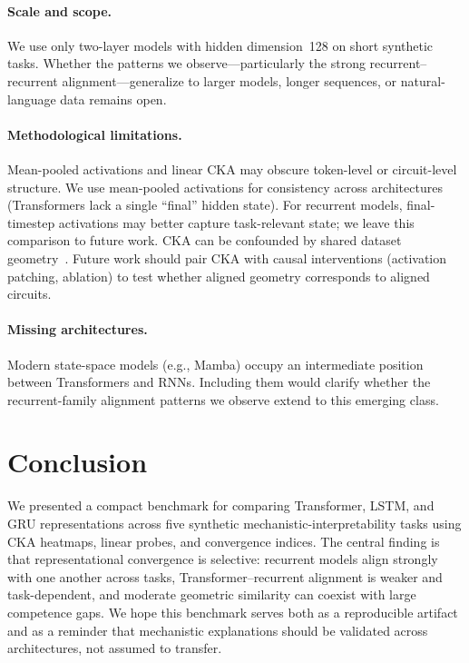 \documentclass{article}
\begin{document}
\paragraph{Scale and scope.}
We use only two-layer models with hidden dimension~128 on short 
synthetic tasks. Whether the patterns we observe---particularly 
the strong recurrent--recurrent alignment---generalize to larger 
models, longer sequences, or natural-language data remains open.

\paragraph{Methodological limitations.}
Mean-pooled activations and linear CKA may obscure token-level or 
circuit-level structure. We use mean-pooled activations for 
consistency across architectures (Transformers lack a single 
``final'' hidden state). For recurrent models, final-timestep 
activations may better capture task-relevant state; we leave 
this comparison to future work. CKA can be confounded by shared 
dataset geometry~\citep{cui2022deconfounded}. Future work should 
pair CKA with causal interventions (activation patching, ablation) 
to test whether aligned geometry corresponds to aligned circuits.

\paragraph{Missing architectures.}
Modern state-space models (e.g., Mamba) occupy an intermediate 
position between Transformers and RNNs. Including them would 
clarify whether the recurrent-family alignment patterns we 
observe extend to this emerging class.

\section{Conclusion}
\label{sec:conclusion}

We presented a compact benchmark for comparing Transformer, LSTM, 
and GRU representations across five synthetic 
mechanistic-interpretability tasks using CKA heatmaps, linear 
probes, and convergence indices. The central finding is that 
representational convergence is selective: recurrent models align 
strongly with one another across tasks, Transformer--recurrent 
alignment is weaker and task-dependent, and moderate geometric 
similarity can coexist with large competence gaps. We hope this 
benchmark serves both as a reproducible artifact and as a 
reminder that mechanistic explanations should be validated across 
architectures, not assumed to transfer.
\end{document}
